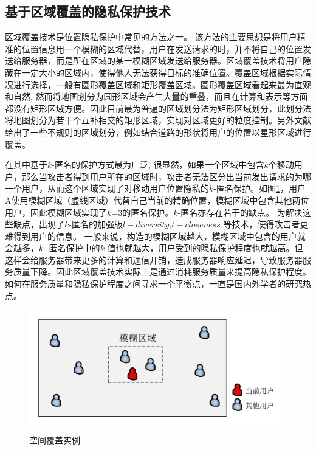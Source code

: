\subsection{基于区域覆盖的隐私保护技术}
区域覆盖技术是位置隐私保护中常见的方法之一\cite{Mokbel}\cite{xu2010privacy}\cite{xu2009feeling}。 该方法的主要思想是将用户精准的位置信息用一个模糊的区域代替，用户在发送请求的时，并不将自己的位置发送给服务器，而是所在区域的某一模糊区域发送给服务器。区域覆盖技术将用户隐藏在一定大小的区域内，使得他人无法获得目标的准确位置。覆盖区域根据实际情况进行选择，一般有圆形覆盖区域和矩形覆盖区域。圆形覆盖区域看起来最为直观和自然\cite{ardagna2007location}\cite{kalnis2007preventing}, 然而将地图划分为圆形区域会产生大量的重叠，而且在计算和表示等方面都没有矩形区域方便。因此目前最为普遍的区域划分法为矩形区域划分，此划分法将地图划分为若干个互补相交的矩形区域，实现对区域更好的粒度控制。另外文献\cite{wang2009privacy}\cite{hossain2011h}给出了一些不规则的区域划分，例如结合道路的形状将用户的位置以星形区域进行覆盖。

在其中基于$k$-匿名的保护方式最为广泛\cite{Bamba}\cite{Mokbel}\cite{wang2010device}\cite{pan2012protecting}, 很显然，如果一个区域中包含$k$个移动用户，那么当攻击者得到用户所在的区域时，攻击者无法区分出当前发出请求的为哪一个用户，从而这个区域实现了对移动用户位置隐私的$k$-匿名保护。如图\ref{fig:cloaking_pdf}，用户A使用模糊区域（虚线区域）代替自己当前的精确位置，模糊区域中包含其他两位用户，因此模糊区域实现了$k$=3的匿名保护。$k$-匿名亦存在若干的缺点\cite{juncheng2014potential}。 为解决这些缺点，出现了$k$-匿名的加强版$l-diversity$\cite{machanavajjhala2007diversity},$t-closeness$\cite{li2007t} 等技术，使得攻击者更难得到用户的信息。 一般来说，构造的模糊区域越大，模糊区域中包含的用户就会越多，$k$- 匿名保护中的$k$ 值也就越大，用户受到的隐私保护程度也就越高。但这样会给服务器带来更多的计算和通信开销，造成服务器响应延迟，导致服务器服务质量下降。因此区域覆盖技术实际上是通过消耗服务质量来提高隐私保护程度。如何在服务质量和隐私保护程度之间寻求一个平衡点，一直是国内外学者的研究热点。
\begin{figure}[H]
\centering
\includegraphics[width=12cm]{fig/cloaking.pdf}
\caption{空间覆盖实例} %
\label{fig:cloaking_pdf}
\end{figure}

